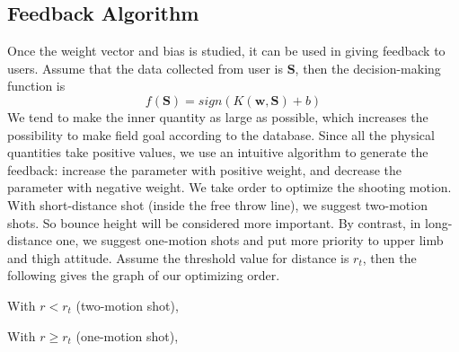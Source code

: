 \documentclass[12pt]{article}
\begin{document}
\subsection{Feedback Algorithm}
Once the weight vector and bias is studied, it can be used in giving feedback to users. Assume that the data collected from user is $\bm{S}$, then the decision-making function is
\begin{equation}
    f(\bm{S}) = sign(K(\bm{w}, \bm{S}) + b)
\end{equation}
We tend to make the inner quantity as large as possible, which increases the possibility to make field goal according to the database. Since all the physical quantities take positive values, we use an intuitive algorithm to generate the feedback: increase the parameter with positive weight, and decrease the parameter with negative weight. We take order to optimize the shooting motion. With short-distance shot (inside the free throw line), we suggest two-motion shots. So bounce height will be considered more important. By contrast, in long-distance one, we suggest one-motion shots and put more priority to upper limb and thigh attitude. Assume the threshold value for distance is $r_t$, then the following gives the graph of our optimizing order. \par \noindent
With $r < r_t$ (two-motion shot),
\begin{center}
\end{center}
With $ r\geq r_t$ (one-motion shot), 
\end{document}
